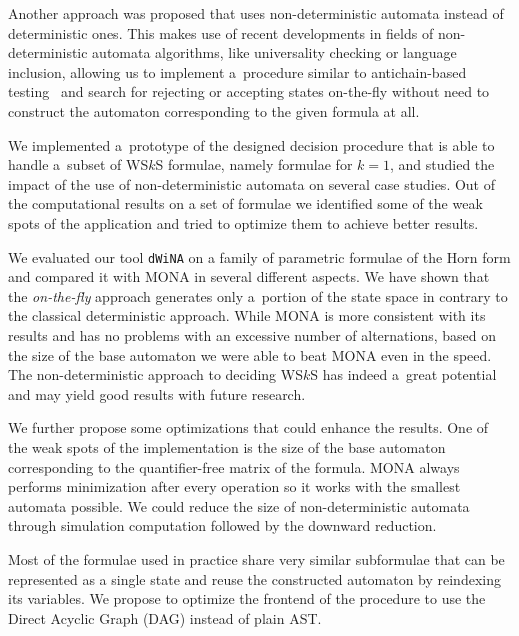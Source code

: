Another approach was proposed that uses non-deterministic automata instead of
deterministic ones. This makes use of recent developments in fields of
non-deterministic automata algorithms, like universality checking or language
inclusion, allowing us to implement a~procedure similar to antichain-based
testing~\cite{tacas} and search for rejecting or accepting states on-the-fly
without need to construct the automaton corresponding to the given formula at
all.

We implemented a~prototype of the designed decision procedure that is able to
handle a~subset of WS$k$S formulae, namely formulae for $k = 1$, and
studied the impact of the use of non-deterministic automata on several case
studies. Out of the computational results on a set of formulae we identified
some of the weak spots of the application and tried to optimize them to achieve
better results.

We evaluated our tool \texttt{dWiNA} on a family of parametric formulae of
the Horn form and compared it with \textsc{MONA} in several different aspects.
We have shown that the \emph{on-the-fly} approach generates only a~portion of
the state space in contrary to the classical deterministic approach. While
\textsc{MONA} is more consistent with its results and has no problems with
an excessive number of alternations, based on the size of the base automaton we
were able to beat \textsc{MONA} even in the speed. The non-deterministic
approach to deciding WS$k$S has indeed a~great potential and may yield good results with future research.

We further propose some optimizations that could
enhance the results. One of the weak spots of the implementation is
the size of the base automaton corresponding to the quantifier-free matrix
of the formula.
\textsc{MONA} always performs minimization after every operation so it works
with the smallest automata possible. We could reduce the size of non-deterministic
automata through simulation computation followed by the downward reduction. 

Most of the formulae used in practice share very similar subformulae that can be
represented as a single state and reuse the constructed automaton by reindexing
its variables. We propose to optimize the frontend of the procedure to use the
Direct Acyclic Graph (DAG) instead of plain AST. 

